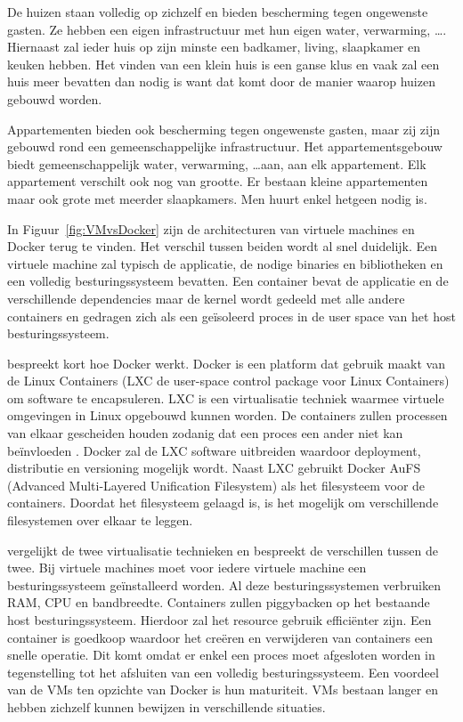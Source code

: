 De huizen staan volledig op zichzelf en bieden bescherming tegen ongewenste gasten.
Ze hebben een eigen infrastructuur met hun eigen water, verwarming, \ldots .
Hiernaast zal ieder huis op zijn minste een badkamer, living, slaapkamer en keuken hebben.
Het vinden van een klein huis is een ganse klus en vaak zal een huis meer bevatten dan nodig is want dat komt door de manier waarop huizen gebouwd worden.

Appartementen bieden ook bescherming tegen ongewenste gasten, maar zij zijn gebouwd rond een gemeenschappelijke infrastructuur.
Het appartementsgebouw biedt gemeenschappelijk water, verwarming, \ldots  aan, aan elk appartement.
Elk appartement verschilt ook nog van grootte.
Er bestaan kleine appartementen maar ook grote met meerder slaapkamers.
Men huurt enkel hetgeen nodig is.

In Figuur~\vref{fig:VMvsDocker} zijn de architecturen van virtuele machines en Docker terug te vinden.
Het verschil tussen beiden wordt al snel duidelijk.
Een virtuele machine zal typisch de applicatie, de nodige binaries en bibliotheken en een volledig besturingssysteem bevatten.
Een container bevat de applicatie en de verschillende dependencies maar de kernel wordt gedeeld met alle andere containers en gedragen zich als een geïsoleerd proces in de user space van het host besturingssysteem.

\citet{chamberlain2014using} bespreekt kort hoe Docker werkt.
Docker is een platform dat gebruik maakt van de Linux Containers (LXC de user-space control package voor Linux Containers) om software te encapsuleren.
LXC is een virtualisatie techniek waarmee virtuele omgevingen in Linux opgebouwd kunnen worden.
De containers zullen processen van elkaar gescheiden houden zodanig dat een proces een ander niet kan beïnvloeden \citep{merkel2014docker}.
Docker zal de LXC software uitbreiden waardoor deployment, distributie en versioning mogelijk wordt.
Naast LXC gebruikt Docker AuFS (Advanced Multi-Layered Unification Filesystem) als het filesysteem voor de containers.
Doordat het filesysteem gelaagd is, is het mogelijk om verschillende filesystemen over elkaar te leggen.

\citet{merkel2014docker} vergelijkt de twee virtualisatie technieken en bespreekt de verschillen tussen de twee.
Bij virtuele machines moet voor iedere virtuele machine een besturingssysteem geïnstalleerd worden.
Al deze besturingssystemen verbruiken RAM, CPU en bandbreedte.
Containers zullen piggybacken op het bestaande host besturingssysteem.
Hierdoor zal het resource gebruik efficiënter zijn.
Een container is goedkoop waardoor het creëren en verwijderen van containers een snelle operatie.
Dit komt omdat er enkel een proces moet afgesloten worden in tegenstelling tot het afsluiten van een volledig besturingssysteem.
Een voordeel van de VMs ten opzichte van Docker is hun maturiteit.
VMs bestaan langer en hebben zichzelf kunnen bewijzen in verschillende situaties.

